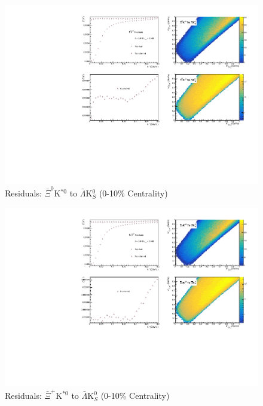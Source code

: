 \documentclass[../AnalysisNoteJBuxton.tex]{subfiles}
\begin{document}
\begin{figure}[h]
  \centering
  \includegraphics[width=\textwidth]{9_AdditionalFigures/Figures/Residuals/ALamK0/Residuals_ALamK0_0010_AXi0KSt0ToALamK0_MomResCrctn_NonFlatBgdCrctn_SingleLamParam_10Res_PrimMaxDecay4fm_UsingXiDataAndCoulombOnly.pdf}
  \caption[Residuals: $\bar{\Xi}^{0}$K$^{*0}$ to $\bar{\Lambda}$K$^{0}_{S}$ (0-10\% Centrality)]{Residuals: $\bar{\Xi}^{0}$K$^{*0}$ to $\bar{\Lambda}$K$^{0}_{S}$ (0-10\% Centrality)}
  \label{fig:Res_ALamK0_0010_AXi0KSt0}
\end{figure}

\begin{figure}[h]
  \centering
  \includegraphics[width=\textwidth]{9_AdditionalFigures/Figures/Residuals/ALamK0/Residuals_ALamK0_0010_AXiKSt0ToALamK0_MomResCrctn_NonFlatBgdCrctn_SingleLamParam_10Res_PrimMaxDecay4fm_UsingXiDataAndCoulombOnly.pdf}
  \caption[Residuals: $\bar{\Xi}^{+}$K$^{*0}$ to $\bar{\Lambda}$K$^{0}_{S}$ (0-10\% Centrality)]{Residuals: $\bar{\Xi}^{+}$K$^{*0}$ to $\bar{\Lambda}$K$^{0}_{S}$ (0-10\% Centrality)}
  \label{fig:Res_ALamK0_0010_AXiCKSt0}
\end{figure}
\end{document}
